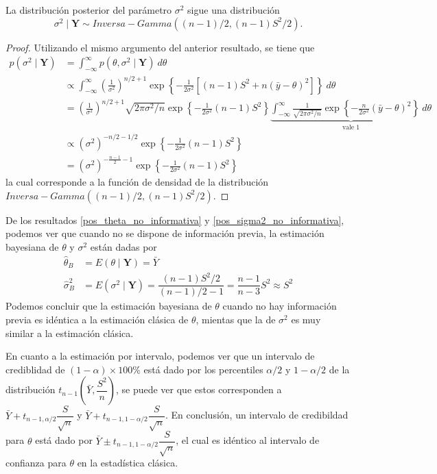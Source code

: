 \begin{Res}\label{pos_sigma2_no_informativa}
La distribución posterior del parámetro $\sigma^2$ sigue una distribución
\begin{equation*}
\sigma^2 \mid \mathbf{Y} \sim Inversa-Gamma((n-1)/2,(n-1)S^2/2).
\end{equation*}
\end{Res}

\begin{proof}
Utilizando el mismo argumento del anterior resultado, se tiene que
\begin{align*}
p(\sigma^2 \mid \mathbf{Y})&= \int_{-\infty}^{\infty} p(\theta,\sigma^2 \mid \mathbf{Y}) \ d\theta \\
& \propto \int_{-\infty}^{\infty} \left(\frac{1}{\sigma^2}\right)^{n/2+1}
\exp\left\{-\frac{1}{2\sigma^2}\left[(n-1)S^2+n(\bar{y}-\theta)^2\right]\right\} \ d\theta \\
& = \left(\frac{1}{\sigma^2}\right)^{n/2+1} \sqrt{2\pi\sigma^2/n}\exp\left\{-\frac{1}{2\sigma^2}(n-1)S^2\right\}\underbrace{\int_{-\infty}^{\infty} \frac{1}{\sqrt{2\pi\sigma^2/n}} \exp\left\{-\frac{n}{2\sigma^2}(\bar{y}-\theta)^2\right\} \ d\theta}_{\text{vale $1$}} \\
& \propto (\sigma^2)^{-n/2-1/2}\exp\left\{-\frac{1}{2\sigma^2}(n-1)S^2\right\}\\
&= (\sigma^2)^{-\frac{n-1}{2}-1}\exp\left\{-\frac{1}{2\sigma^2}(n-1)S^2\right\}
\end{align*}
la cual corresponde a la función de densidad de la distribución $Inversa-Gamma((n-1)/2,(n-1)S^2/2)$.
\end{proof}

De los resultados \ref{pos_theta_no_informativa} y \ref{pos_sigma2_no_informativa}, podemos ver que cuando no se dispone de información previa, la estimación bayesiana de $\theta$ y $\sigma^2$ están dadas por
\begin{align*}
\hat{\theta}_B&=E(\theta\mid\mathbf{Y})=\bar{Y}\\
\hat{\sigma}^2_B&=E(\sigma^2\mid\mathbf{Y})=\dfrac{(n-1)S^2/2}{(n-1)/2-1}=\dfrac{n-1}{n-3}S^2\approx S^2
\end{align*}
Podemos concluir que la estimación bayesiana de $\theta$ cuando no hay información previa es idéntica a la estimación clásica de $\theta$, mientas que la de $\sigma^2$ es muy similar a la estimación clásica.

En cuanto a la estimación por intervalo, podemos ver que un intervalo de crediblidad de $(1-\alpha)\times 100\%$ está dado por los percentiles $\alpha/2$ y $1-\alpha/2$ de la distribución $t_{n-1}\left(\bar{Y},\dfrac{S^2}{n}\right)$, se puede ver que estos corresponden a $\bar{Y}+t_{n-1,\alpha/2}\dfrac{S}{\sqrt{n}}$ y $\bar{Y}+t_{n-1,1-\alpha/2}\dfrac{S}{\sqrt{n}}$. En conclusión, un intervalo de credibildad para $\theta$ está dado por $\bar{Y}\pm t_{n-1,1-\alpha/2}\dfrac{S}{\sqrt{n}}$, el cual es idéntico al intervalo de confianza para $\theta$ en la estadística clásica.

